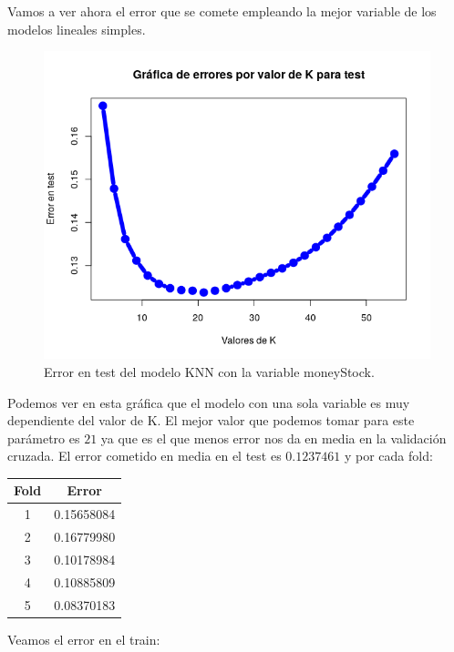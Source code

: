 \documentclass[12pt,a4paper]{article}
\begin{document}
Vamos a ver ahora el error que se comete empleando la mejor variable de los modelos lineales simples.

\begin{figure}[H]
	\centering 
	\includegraphics[scale=0.6]{./Imagenes/Regresion/knn3.png}
	\caption{Error en test del modelo KNN con la variable moneyStock.}
\end{figure}

Podemos ver en esta gráfica que el modelo con una sola variable es muy dependiente del valor de K. El mejor valor que podemos tomar para este parámetro es $21$ ya que es el que menos error nos da en media en la validación cruzada. El error cometido en media en el test es $0.1237461$ y por cada fold:

\begin{table}[H]
	\centering
	\begin{tabular}{|c|c|}
		\hline
		\textbf{Fold} & \textbf{Error} \\ \hline
		1              & 0.15658084     \\ \hline
		2              & 0.16779980     \\ \hline
		3              & 0.10178984     \\ \hline
		4              & 0.10885809     \\ \hline
		5              & 0.08370183     \\ \hline
	\end{tabular}
\end{table}

Veamos el error en el train:
\end{document}
